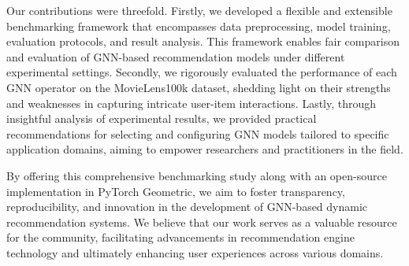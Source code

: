 \documentclass{scrartcl}
\begin{document}
Our contributions were threefold. Firstly, we developed a flexible and extensible benchmarking framework that encompasses data preprocessing, model training, evaluation protocols, and result analysis. This framework enables fair comparison and evaluation of GNN-based recommendation models under different experimental settings. Secondly, we rigorously evaluated the performance of each GNN operator on the MovieLens100k dataset, shedding light on their strengths and weaknesses in capturing intricate user-item interactions. Lastly, through insightful analysis of experimental results, we provided practical recommendations for selecting and configuring GNN models tailored to specific application domains, aiming to empower researchers and practitioners in the field.

By offering this comprehensive benchmarking study along with an open-source implementation in PyTorch Geometric, we aim to foster transparency, reproducibility, and innovation in the development of GNN-based dynamic recommendation systems. We believe that our work serves as a valuable resource for the community, facilitating advancements in recommendation engine technology and ultimately enhancing user experiences across various domains.
\end{document}
